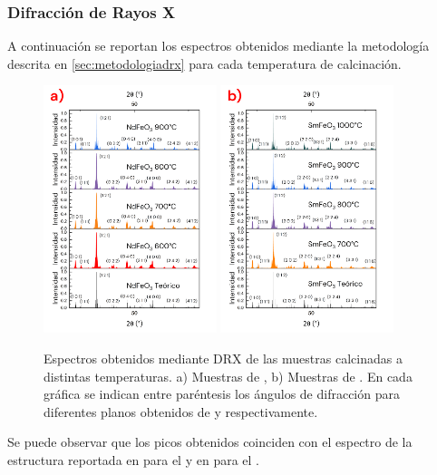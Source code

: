 \documentclass[../main.tex]{subfiles}
\begin{document}
\subsubsection{Difracción de Rayos X} \label{sec:analisisDRX}
A continuación se reportan los espectros obtenidos mediante la metodología descrita en \ref{sec:metodologiadrx} para cada temperatura de calcinación.
\begin{figure}[H]
    \centering
    \includegraphics[width=0.45\textwidth]{fig/drxtempndfeo3.png}
    \quad
    \includegraphics[width=0.45\textwidth]{fig/drxtempsmfeo3.png}
    \caption{Espectros obtenidos mediante DRX de las muestras calcinadas a distintas temperaturas. a) Muestras de \neod{}, b) Muestras de \sama{}. En cada gráfica se indican entre paréntesis los ángulos de difracción para diferentes planos obtenidos de \cite{ndfeo3} y \cite{smfeo3} respectivamente.}
    \label{fig:drxtempcomp}
\end{figure}
Se puede observar que los picos obtenidos coinciden con el espectro de la estructura reportada en \cite{ndfeo3} para el \neod{} y en \cite{smfeo3} para el \sama{}.
\end{document}
